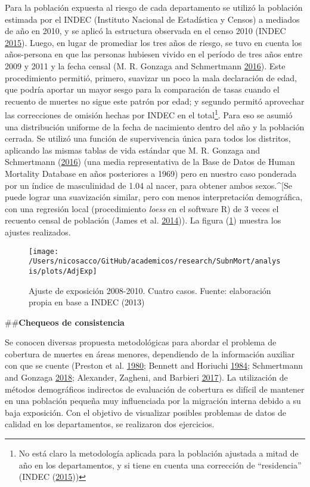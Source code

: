 \documentclass[12pt,]{article}
\begin{document}
Para la población expuesta al riesgo de cada departamento se utilizó la
población estimada por el INDEC (Instituto Nacional de Estadística y
Censos) a mediados de año en 2010, y se aplicó la estructura observada
en el censo 2010 (INDEC \protect\hyperlink{ref-INDEC2015}{2015}). Luego,
en lugar de promediar los tres años de riesgo, se tuvo en cuenta los
años-persona en que las personas hubiesen vivido en el período de tres
años entre 2009 y 2011 y la fecha censal (M. R. Gonzaga and Schmertmann
\protect\hyperlink{ref-Gonzaga_Schmertmann_2016}{2016}). Este
procedimiento permitió, primero, suavizar un poco la mala declaración de
edad, que podría aportar un mayor sesgo para la comparación de tasas
cuando el recuento de muertes no sigue este patrón por edad; y segundo
permitó aprovechar las correcciones de omisión hechas por INDEC en el
total\footnote{No está claro la metodología aplicada para la población
  ajustada a mitad de año en los departamentos, y si tiene en cuenta una
  corrección de ``residencia'' (INDEC
  (\protect\hyperlink{ref-INDEC2015}{2015}))}. Para eso se asumió una
distribución uniforme de la fecha de nacimiento dentro del año y la
población cerrada. Se utilizó una función de supervivencia única para
todos los distritos, aplicando las mismas tablas de vida estándar que M.
R. Gonzaga and Schmertmann
(\protect\hyperlink{ref-Gonzaga_Schmertmann_2016}{2016}) (una media
representativa de la Base de Datos de Human Mortality Database en años
posteriores a 1969) pero en nuestro caso ponderada por un índice de
masculinidad de 1.04 al nacer, para obtener ambos sexos.\^{}{[}Se puede
lograr una suavización similar, pero con menos interpretación
demográfica, con una regresión local (procedimiento \emph{loess} en el
software R) de 3 veces el recuento censal de población (James et al.
\protect\hyperlink{ref-James2014}{2014})). La figura (\ref{fig:AdjExp})
muestra los ajustes realizados.

\begin{figure}

{\centering \texttt{[image: /Users/nicosacco/GitHub/academicos/research/SubnMort/analysis/plots/AdjExp]} 

}

\caption{Ajuste de exposición 2008-2010. Cuatro casos. Fuente: elaboración propia en base a INDEC (2013)}\label{fig:AdjExp}
\end{figure}

\#\#\textbf{Chequeos de consistencia}

Se conocen diversas propuesta metodológicas para abordar el problema de
cobertura de muertes en áreas menores, dependiendo de la información
auxiliar con que se cuente (Preston et al.
\protect\hyperlink{ref-Preston1980}{1980}; Bennett and Horiuchi
\protect\hyperlink{ref-Bennett_Horiuchi_1984}{1984}; Schmertmann and
Gonzaga \protect\hyperlink{ref-Schmertmann2018}{2018}; Alexander,
Zagheni, and Barbieri \protect\hyperlink{ref-Alexander2017}{2017}). La
utilización de métodos demográficos indirectos de evaluación de
cobertura es difícil de mantener en una población pequeña muy
influenciada por la migración interna debido a su baja exposición. Con
el objetivo de visualizar posibles problemas de datos de calidad en los
departamentos, se realizaron dos ejercicios.
\end{document}
